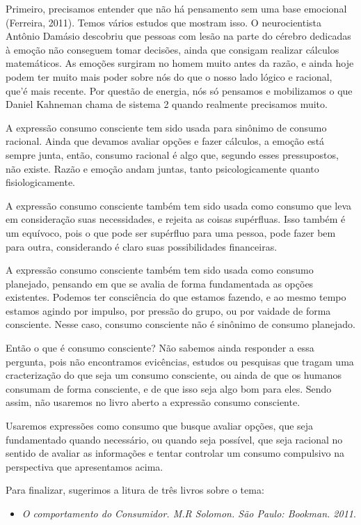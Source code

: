 \begin{paginatexto}
Primeiro, precisamos entender que não há pensamento sem uma base emocional (Ferreira, 2011). Temos vários estudos que mostram isso. O neurocientista Antônio Damásio descobriu que pessoas com lesão na parte do cérebro dedicadas à emoção não conseguem tomar decisões, ainda que consigam realizar cálculos matemáticos. As emoções surgiram no homem muito antes da razão, e ainda hoje podem ter muito mais poder sobre nós do que o nosso lado lógico e racional, que'é mais recente. Por questão de energia, nós só pensamos e mobilizamos o que Daniel Kahneman chama de sistema 2 quando realmente precisamos muito.

A expressão consumo consciente tem sido usada para sinônimo de consumo racional. Ainda que devamos avaliar opções e fazer cálculos, a emoção está sempre junta, então, consumo racional é algo que, segundo esses pressupostos, não existe. Razão e emoção andam juntas, tanto psicologicamente quanto fisiologicamente.

A expressão consumo consciente também tem sido usada como consumo que leva em consideração suas necessidades, e rejeita as coisas supérfluas. Isso também é um equívoco, pois o que pode ser supérfluo para uma pessoa, pode fazer bem para outra, considerando é claro suas possibilidades financeiras.

A expressão consumo consciente também tem sido usada como consumo planejado, pensando em que se avalia de forma fundamentada as opções existentes. Podemos ter consciência do que estamos fazendo, e ao mesmo tempo estamos agindo por impulso, por pressão do grupo, ou por vaidade de forma consciente. Nesse caso, consumo consciente não é sinônimo de consumo planejado.

Então o que é consumo consciente? Não sabemos ainda responder a essa pergunta, pois não encontramos evicências, estudos ou pesquisas que tragam uma cracterização do que seja um consumo consciente, ou ainda de que os humanos consumam de forma consciente, e de que isso seja algo bom para eles. Sendo assim, não usaremos no livro aberto a expressão consumo consciente.

Usaremos expressões como consumo que busque avaliar opções, que seja fundamentado quando necessário, ou quando seja possível, que seja racional no sentido de avaliar as informações e tentar controlar um consumo compulsivo na perspectiva que apresentamos acima.


   Para finalizar, sugerimos a litura de três livros sobre o tema:
  \begin{itemize}
    \item \textit{O comportamento do Consumidor. M.R Solomon. São Paulo: Bookman. 2011}.


\end{itemize}
\end{paginatexto}
